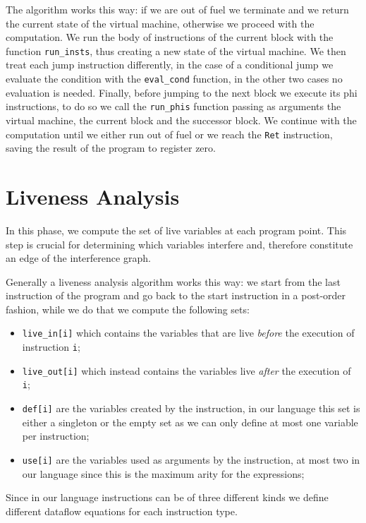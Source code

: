 The algorithm works this way: if we are out of fuel we terminate and we return the current state of the virtual machine, otherwise we proceed with the computation.
We run the body of instructions of the current block with the function \texttt{run\_insts}, thus creating a new state of the virtual machine. We then treat each jump instruction differently, in the case of a conditional jump we evaluate the condition with the \texttt{eval\_cond} function, in the other two cases no evaluation is needed. Finally, before jumping to the next block we execute its phi instructions, to do so we call the \texttt{run\_phis} function  passing as arguments the virtual machine, the current block and the successor block.
We continue with the computation until we either run out of fuel or we reach the \texttt{Ret} instruction, saving the result of the program to register zero.

\section{Liveness Analysis}

In this phase, we compute the set of live variables at each program point. This step is crucial for determining which variables interfere and, therefore constitute an edge of the interference graph.

Generally a liveness analysis algorithm works this way:
we start from the last instruction of the program and go back to the start instruction in a post-order fashion, while we do that we compute the following sets:
\begin{itemize}
  \item \texttt{live\_in[i]} which contains the variables that are live \textit{before} the execution of instruction \texttt i;
  \item \texttt{live\_out[i]} which instead contains the variables live \textit{after} the execution of \texttt i;
  \item \texttt{def[i]} are the variables created by the instruction, in our language this set is either a singleton or the empty set as we can only define at most one variable per instruction;
  \item \texttt{use[i]} are the variables used as arguments by the instruction, at most two in our language since this is the maximum arity for the expressions;
\end{itemize}

Since in our language instructions can be of three different kinds we define different dataflow equations for each instruction type.

